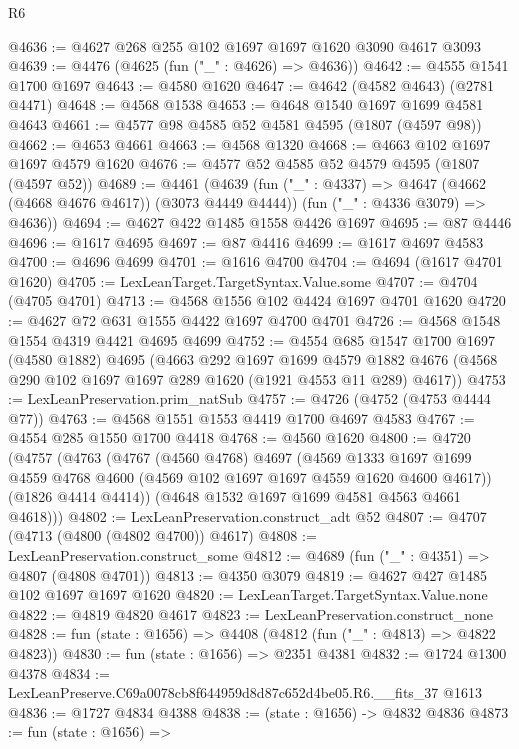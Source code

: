 \begin{lexlean}{R6}
\begin{coremodule}
@4636 := @4627 @268 @255 @102 @1697 @1697 @1620 @3090 @4617 @3093
@4639 := @4476 (@4625 (fun ("_" : @4626) => @4636))
@4642 := @4555 @1541 @1700 @1697
@4643 := @4580 @1620
@4647 := @4642 (@4582 @4643) (@2781 @4471)
@4648 := @4568 @1538
@4653 := @4648 @1540 @1697 @1699 @4581 @4643
@4661 := @4577 @98 @4585 @52 @4581 @4595 (@1807 (@4597 @98))
@4662 := @4653 @4661
@4663 := @4568 @1320
@4668 := @4663 @102 @1697 @1697 @4579 @1620
@4676 := @4577 @52 @4585 @52 @4579 @4595 (@1807 (@4597 @52))
@4689 := @4461
    (@4639
      (fun ("_" : @4337) => @4647 (@4662 (@4668 @4676 @4617)) (@3073 @4449 @4444))
      (fun ("_" : @4336 @3079) => @4636))
@4694 := @4627 @422 @1485 @1558 @4426 @1697
@4695 := @87 @4446
@4696 := @1617 @4695
@4697 := @87 @4416
@4699 := @1617 @4697 @4583
@4700 := @4696 @4699
@4701 := @1616 @4700
@4704 := @4694 (@1617 @4701 @1620)
@4705 := LexLeanTarget.TargetSyntax.Value.some
@4707 := @4704 (@4705 @4701)
@4713 := @4568 @1556 @102 @4424 @1697 @4701 @1620
@4720 := @4627 @72 @631 @1555 @4422 @1697 @4700 @4701
@4726 := @4568 @1548 @1554 @4319 @4421 @4695 @4699
@4752 := @4554
    @685
    @1547
    @1700
    @1697
    (@4580 @1882)
    @4695
    (@4663
      @292
      @1697
      @1699
      @4579
      @1882
      @4676
      (@4568 @290 @102 @1697 @1697 @289 @1620 (@1921 @4553 @11 @289) @4617))
@4753 := LexLeanPreservation.prim_natSub
@4757 := @4726 (@4752 (@4753 @4444 @77))
@4763 := @4568 @1551 @1553 @4419 @1700 @4697 @4583
@4767 := @4554 @285 @1550 @1700 @4418
@4768 := @4560 @1620
@4800 := @4720
    (@4757
      (@4763
        (@4767
          (@4560 @4768)
          @4697
          (@4569
            @1333
            @1697
            @1699
            @4559
            @4768
            @4600
            (@4569 @102 @1697 @1697 @4559 @1620 @4600 @4617))
          (@1826 @4414 @4414))
        (@4648 @1532 @1697 @1699 @4581 @4563 @4661 @4618)))
@4802 := LexLeanPreservation.construct_adt @52
@4807 := @4707 (@4713 (@4800 (@4802 @4700)) @4617)
@4808 := LexLeanPreservation.construct_some
@4812 := @4689 (fun ("_" : @4351) => @4807 (@4808 @4701))
@4813 := @4350 @3079
@4819 := @4627 @427 @1485 @102 @1697 @1697 @1620
@4820 := LexLeanTarget.TargetSyntax.Value.none
@4822 := @4819 @4820 @4617
@4823 := LexLeanPreservation.construct_none
@4828 := fun (state : @1656) => @4408 (@4812 (fun ("_" : @4813) => @4822 @4823))
@4830 := fun (state : @1656) => @2351 @4381
@4832 := @1724 @1300 @4378
@4834 := LexLeanPreserve.C69a0078cb8f644959d8d87c652d4be05.R6.__fits_37 @1613
@4836 := @1727 @4834 @4388
@4838 := (state : @1656) -> @4832 @4836
@4873 := fun (state : @1656) =>

\end{coremodule}
\end{lexlean}
